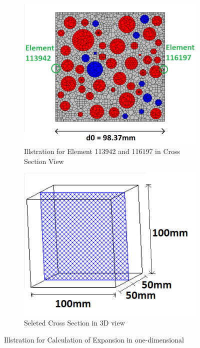 \begin{figure}[!h]
\centering
\begin{subfigure}{.5\textwidth}
  \centering
  \includegraphics[width=1.0\linewidth]{Files/Method/exp2D.png}
  \caption{Illstration for Element 113942 and 116197 in Cross Section View}
\end{subfigure}%
\begin{subfigure}{.5\textwidth}
  \centering
  \includegraphics[width=1.0\linewidth]{Files/Method/exp3D.png}
  \caption{Seleted Cross Section in 3D view}
\end{subfigure}
\caption{Illstration for Calculation of Expansion in one-dimensional}
\label{exp_illstration2}
\end{figure}


